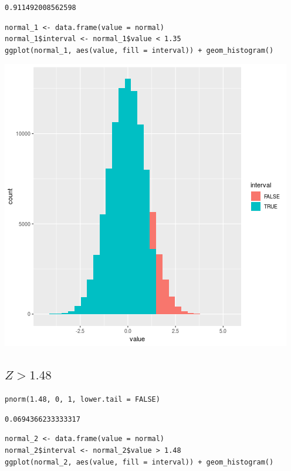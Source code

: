 \documentclass[11pt]{article}
\begin{document}
\begin{verbatim}
0.911492008562598
\end{verbatim}



\begin{verbatim}
normal_1 <- data.frame(value = normal)
normal_1$interval <- normal_1$value < 1.35
ggplot(normal_1, aes(value, fill = interval)) + geom_histogram()
\end{verbatim}

\begin{center}
\includegraphics[width=.9\linewidth]{1-1.png}
\end{center}

\subsection{\(Z > 1.48\)}
\label{sec:org9d08d29}

\begin{verbatim}
pnorm(1.48, 0, 1, lower.tail = FALSE)
\end{verbatim}

\begin{verbatim}
0.0694366233333317
\end{verbatim}


\begin{verbatim}
normal_2 <- data.frame(value = normal)
normal_2$interval <- normal_2$value > 1.48
ggplot(normal_2, aes(value, fill = interval)) + geom_histogram()
\end{verbatim}
\end{document}
